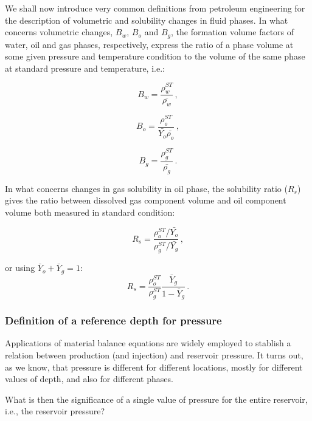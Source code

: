 \documentclass[authoryear,preprint,review,12pt]{elsarticle}
\begin{document}
We shall now introduce very common definitions from petroleum engineering for the description of volumetric and solubility changes in fluid phases. In what concerns volumetric changes, $B_w$, $B_o$ and $B_g$, the formation volume factors of water, oil and gas phases, respectively, express the ratio of a phase volume at some given pressure and temperature condition to the volume of the same phase at standard pressure and temperature, i.e.:

\begin{equation}\label{eq: Bw}
B_w = \frac{\rho_w^{ST}}{\bar{\rho_w}} \, ,
\end{equation}

\begin{equation}\label{eq: Bo}
B_o = \frac{\rho_o^{ST}}{\bar{Y_o} \bar{\rho_o}} \, ,
\end{equation}

\begin{equation}\label{eq: Bg}
B_g = \frac{\rho_g^{ST}}{\bar{\rho_g}} \, .
\end{equation}

In what concerns changes in gas solubility in oil phase, the solubility ratio ($R_s$) gives the ratio between dissolved gas component volume and oil component volume both measured in standard condition:

\begin{equation}
R_s = \frac{\rho_o^{ST} / \bar{Y_o}}{\rho_g^{ST} / \bar{Y_g}} \, ,
\end{equation}

or using $\bar{Y}_o + \bar{Y}_g = 1$:
\begin{equation}
R_s = \frac{\rho_o^{ST}}{\rho_g^{ST}}\frac{\bar{Y}_g}{1-\bar{Y}_g} \, .
\end{equation}

\subsubsection{Definition of a reference depth for pressure}

Applications of material balance equations are widely employed to stablish a relation between production (and injection) and reservoir pressure. It turns out, as we know, that pressure is different for different locations, mostly for different values of depth, and also for different phases.

What is then the significance of a single value of pressure for the entire reservoir, i.e., the reservoir pressure? 
\end{document}
